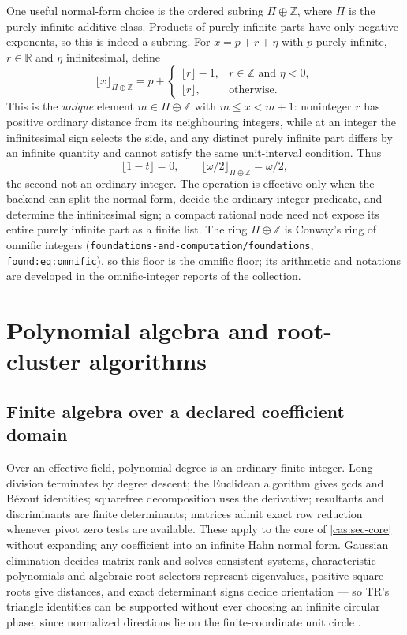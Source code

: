 \documentclass[11pt,letterpaper]{article}
\numberwithin{equation}{section}
\theoremstyle{definition}
\theoremstyle{remark}
\newcommand{\R}{\mathbb R}
\newcommand{\Z}{\mathbb Z}
\begin{document}
One useful normal-form choice is the ordered subring $\Pi\oplus\Z$, where $\Pi$
is the purely infinite additive class. Products of purely infinite parts have
only negative exponents, so this is indeed a subring. For $x=p+r+\eta$ with $p$
purely infinite, $r\in\R$ and $\eta$ infinitesimal, define
\begin{equation}\label{cas:eq-floor}
 \lfloor x\rfloor_{\Pi\oplus\Z}
 =p+\begin{cases}
 \lfloor r\rfloor-1,&r\in\Z\text{ and }\eta<0,\\
 \lfloor r\rfloor,&\text{otherwise.}
 \end{cases}
\end{equation}
This is the \emph{unique} element $m\in\Pi\oplus\Z$ with $m\le x<m+1$:
noninteger $r$ has positive ordinary distance from its neighbouring integers,
while at an integer the infinitesimal sign selects the side, and any distinct
purely infinite part differs by an infinite quantity and cannot satisfy the same
unit-interval condition. Thus
\[
 \lfloor1-t\rfloor=0,\qquad
 \lfloor\omega/2\rfloor_{\Pi\oplus\Z}=\omega/2 ,
\]
the second not an ordinary integer. The operation is effective only when the
backend can split the normal form, decide the ordinary integer predicate, and
determine the infinitesimal sign; a compact rational node need not expose its
entire purely infinite part as a finite list. The ring $\Pi\oplus\Z$ is Conway's
ring of omnific integers (\nolinkurl{foundations-and-computation/foundations},
\texttt{found:eq:omnific}), so this floor is the omnific floor; its arithmetic
and notations are developed in the omnific-integer reports of the collection.

\section{Polynomial algebra and root-cluster algorithms}
\label{cas:sec-polynomials}

\subsection{Finite algebra over a declared coefficient domain}
\label{cas:sub-finitealgebra}
Over an effective field, polynomial degree is an ordinary finite integer. Long
division terminates by degree descent; the Euclidean algorithm gives gcds and
B\'ezout identities; squarefree decomposition uses the derivative; resultants
and discriminants are finite determinants; matrices admit exact row reduction
whenever pivot zero tests are available. These apply to the core of
\cref{cas:sec-core} without expanding any coefficient into an infinite Hahn
normal form. Gaussian elimination decides matrix rank and solves consistent
systems, characteristic polynomials and algebraic root selectors represent
eigenvalues, positive square roots give distances, and exact determinant signs
decide orientation --- so TR's triangle identities can be supported without ever
choosing an infinite circular phase, since normalized directions lie on the
finite-coordinate unit circle \cite{cas:SourceTrig}.
\end{document}
